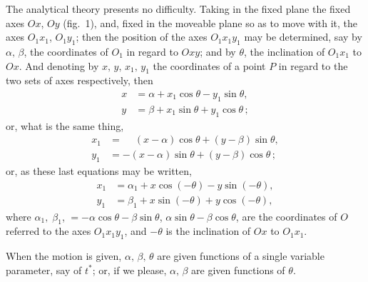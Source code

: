 \documentclass[11pt]{article}
\begin{document}
The analytical theory presents no difficulty. Taking in the fixed plane the fixed
axes $Ox$, $Oy$ (fig.\ 1), and, fixed in the moveable plane so as to move with it, the
axes $O_1 x_1$, $O_1 y_1$; then the position of the axes $O_1 x_1 y_1$ may be determined, say by
$\alpha,\,\beta$, the coordinates of $O_1$ in regard to $Oxy$; and by $\theta$, the inclination of $O_1 x_1$ to
$Ox$. And denoting by $x,\,y,\,x_1,\,y_1$ the coordinates of a point $P$ in regard to the two
sets of axes respectively, then
\begin{align*}
x &= \alpha + x_1 \cos\theta - y_1 \sin\theta,\\
y &= \beta  + x_1 \sin\theta + y_1 \cos\theta\,;
\end{align*}
or, what is the same thing,
\begin{align*}
x_1 &= \phantom{-}(x-\alpha)\cos\theta + (y-\beta)\sin\theta,\\
y_1 &= -(x-\alpha)\sin\theta + (y-\beta)\cos\theta\,;
\end{align*}
or, as these last equations may be written,
\begin{align*}
x_1 &= \alpha_1 + x\cos(-\theta) - y\sin(-\theta),\\
y_1 &= \beta_1 + x\sin(-\theta) + y\cos(-\theta),
\end{align*}
where $\alpha_1,\;\beta_1$, $= -\alpha\cos\theta - \beta\sin\theta$, $\alpha\sin\theta - \beta\cos\theta$, are the coordinates of $O$ referred to
the axes $O_1 x_1 y_1$, and $-\theta$ is the inclination of $Ox$ to $O_1 x_1$.

When the motion is given, $\alpha,\,\beta,\,\theta$ are given functions of a single variable
parameter, say of $t^*$; or, if we please, $\alpha,\,\beta$ are given functions of $\theta$.

\bigskip
\end{document}

